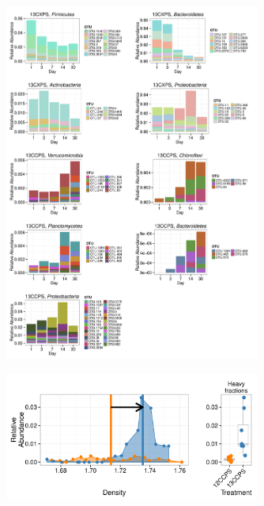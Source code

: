 \begin{figure}[H]
	\begin{center}
    \centerline{\includegraphics[width=0.75\textwidth]{figures/bulk_phylum_rspndr_abund/abund_v_time_phyla.pdf}}
	\caption{\protect}\label{fig:babund}
        \end{center}
\end{figure}

\begin{figure}[H] \begin{center}
\centerline{\includegraphics[width=0.75\textwidth]{figures/conceptual1/conceptual1.pdf}}
\caption{\protect}\label{fig:c1}
\end{center} \end{figure}

